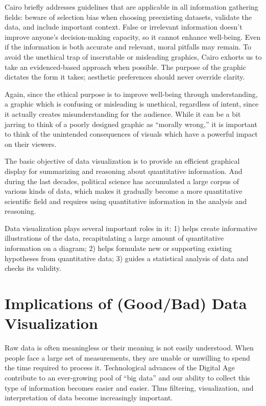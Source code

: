 \documentclass[]{book}
\theoremstyle{definition}
\theoremstyle{definition}
\theoremstyle{definition}
\theoremstyle{remark}
\begin{document}
Cairo briefly addresses guidelines that are applicable in all
information gathering fields: beware of selection bias when choosing
preexisting datasets, validate the data, and include important context.
False or irrelevant information doesn't improve anyone's decision-making
capacity, so it cannot enhance well-being. Even if the information is
both accurate and relevant, moral pitfalls may remain. To avoid the
unethical trap of inscrutable or misleading graphics, Cairo exhorts us
to take an evidenced-based approach when possible. The purpose of the
graphic dictates the form it takes; aesthetic preferences should never
override clarity.

Again, since the ethical purpose is to improve well-being through
understanding, a graphic which is confusing or misleading is unethical,
regardless of intent, since it actually creates misunderstanding for the
audience. While it can be a bit jarring to think of a poorly designed
graphic as ``morally wrong,'' it is important to think of the unintended
consequences of visuals which have a powerful impact on their viewers.

The basic objective of data visualization is to provide an efficient
graphical display for summarizing and reasoning about quantitative
information. And during the last decades, political science has
accumulated a large corpus of various kinds of data, which makes it
gradually become a more quantitative scientific field and requires using
quantitative information in the analysis and reasoning.

Data visualization plays several important roles in it: 1) helps create
informative illustrations of the data, recapitulating a large amount of
quantitative information on a diagram; 2) helps formulate new or
supporting existing hypotheses from quantitative data; 3) guides a
statistical analysis of data and checks its validity.

\section{Implications of (Good/Bad) Data
Visualization}\label{implications-of-goodbad-data-visualization}

Raw data is often meaningless or their meaning is not easily understood.
When people face a large set of measurements, they are unable or
unwilling to spend the time required to process it. Technological
advances of the Digital Age contribute to an ever-growing pool of ``big
data'' and our ability to collect this type of information becomes
easier and easier. Thus filtering, visualization, and interpretation of
data become increasingly important.
\end{document}

